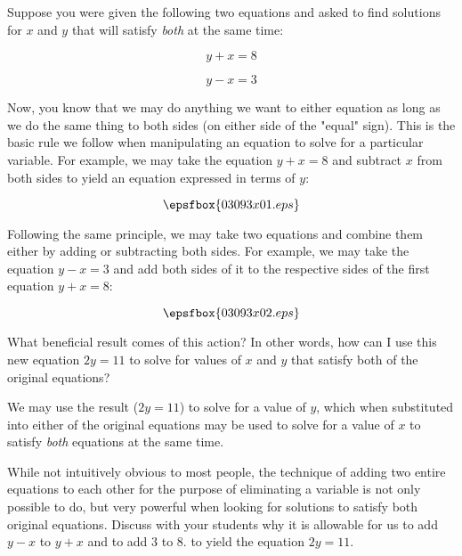 

Suppose you were given the following two equations and asked to find solutions for $x$ and $y$ that will satisfy {\it both} at the same time:

$$y + x = 8$$

$$y - x = 3$$

Now, you know that we may do anything we want to either equation as long as we do the same thing to both sides (on either side of the "equal" sign).  This is the basic rule we follow when manipulating an equation to solve for a particular variable.  For example, we may take the equation $y + x = 8$ and subtract $x$ from both sides to yield an equation expressed in terms of $y$:

$$\epsfbox{03093x01.eps}$$

Following the same principle, we may take two equations and combine them either by adding or subtracting both sides.  For example, we may take the equation $y - x = 3$ and add both sides of it to the respective sides of the first equation $y + x = 8$:

$$\epsfbox{03093x02.eps}$$

What beneficial result comes of this action?  In other words, how can I use this new equation $2y = 11$ to solve for values of $x$ and $y$ that satisfy both of the original equations?







We may use the result ($2y = 11$) to solve for a value of $y$, which when substituted into either of the original equations may be used to solve for a value of $x$ to satisfy {\it both} equations at the same time.







While not intuitively obvious to most people, the technique of adding two entire equations to each other for the purpose of eliminating a variable is not only possible to do, but very powerful when looking for solutions to satisfy both original equations.  Discuss with your students why it is allowable for us to add $y - x$ to $y + x$ and to add $3$ to $8$. to yield the equation $2y = 11$.




